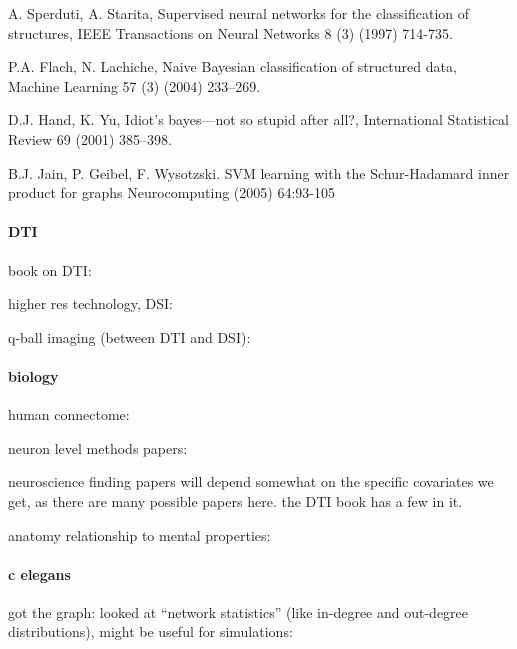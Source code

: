 A. Sperduti, A. Starita, Supervised neural networks for the classification of structures, IEEE Transactions on Neural Networks 8 (3) (1997) 714-735.

P.A. Flach, N. Lachiche, Naive Bayesian classiﬁcation of structured data, Machine Learning 57 (3) (2004) 233–269. 

D.J. Hand, K. Yu, Idiot’s bayes—not so stupid after all?, International Statistical Review 69 (2001) 385–398.

B.J. Jain, P. Geibel, F. Wysotzski.  SVM learning with the Schur-Hadamard inner product for graphs Neurocomputing (2005) 64:93-105

\paragraph{DTI}

book on DTI: \cite{DTIbook09}

higher res technology, DSI: \cite{AlexanderPark01}

q-ball imaging (between DTI and DSI): \cite{Tuch03}


\paragraph{biology}

human connectome: \cite{SpornsKotter05, Seung09}

neuron level methods papers: \cite{DenkHorstmann04, BriggmanDenk06, LuLichtman09}

neuroscience finding papers will depend somewhat on the specific covariates we get, as there are many possible papers here.  the DTI book has a few in it.

anatomy relationship to mental properties: \cite{HutchinsonSchlaug03}

\paragraph{c elegans}

got the graph: \cite{WhiteBrenner86}
looked at ``network statistics'' (like in-degree and out-degree distributions), might be useful for simulations: \cite{ReiglChklovski04}

